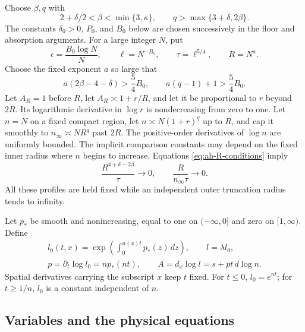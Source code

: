 Choose \(\beta,q\) with
\begin{equation}\label{eq:ah-beta-q}
 2+\delta/2<\beta<\min\{3,\kappa\},
 \qquad q>\max\{3+\delta,2\beta\}.
\end{equation}
The constants \(\delta_0>0\), \(P_0\), and \(B_0\) below are chosen
successively in the floor and absorption arguments.  For a large
integer \(N\), put
\begin{equation}\label{eq:ah-profiles}
 \epsilon=\frac{B_0\log N}{N},\qquad
 \ell=N^{-B_0},\qquad \tau=\ell^{5/4},\qquad R=N^a .
\end{equation}
Choose the fixed exponent \(a\) so large that
\begin{equation}\label{eq:ah-R-conditions}
 a(2\beta-4-\delta)>\frac54B_0,\qquad
 a(q-1)+1>\frac54B_0.
\end{equation}
Let \(A_R=1\) before \(R\), let \(A_R\asymp1+r/R\), and let it be
proportional to \(r\) beyond \(2R\).  Its logarithmic derivative in
\(\log r\) is nondecreasing from zero to one.  Let \(n=N\) on a
fixed compact region, let \(n\asymp N(1+r)^q\) up to \(R\), and
cap it smoothly to \(n_\infty\asymp NR^q\) past \(2R\).  The
positive-order derivatives of \(\log n\) are uniformly bounded.
The implicit comparison constants may depend on the fixed inner
radius where \(n\) begins to increase.  Equations
\eqref{eq:ah-R-conditions} imply
\begin{equation}\label{eq:ah-small-ratios}
 \frac{R^{4+\delta-2\beta}}{\tau}\longrightarrow0,\qquad
 \frac{R}{n_\infty\tau}\longrightarrow0 .
\end{equation}
All these profiles are held fixed while an independent outer
truncation radius tends to infinity.

Let \(p_*\) be smooth and nonincreasing, equal to one on
\((-\infty,0]\) and zero on \([1,\infty)\).  Define
\[
 \begin{gathered}
 l_0(t,x)=\exp\!\left(\int_0^{n(x)t}p_*(z)\,dz\right),\qquad
 l=\lambda l_0,\\
 p=\partial_t\log l_0=np_*(nt),\qquad
 A=d_x\log l=s+pt\,d\log n .
 \end{gathered}
\]
Spatial derivatives carrying the subscript \(x\) keep \(t\) fixed.
For \(t\le0\), \(l_0=e^{nt}\); for \(t\ge1/n\), \(l_0\) is a
constant independent of \(n\).

\subsection{Variables and the physical equations}
\label{subsec:ah-equations}

